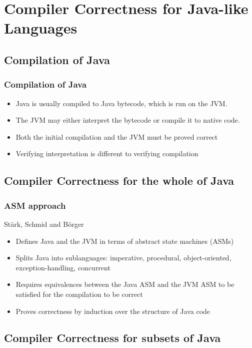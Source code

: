 \documentclass{beamer}
\newcommand{\footmake}[1]{
\ifthenelse{\equal{#1}{}}%
	{}%
	{\footnotetext{#1}}%
}
\newenvironment{slide}[2][fragile,environment=slide]
{\begin{frame}[#1]
	\frametitle{#2}\begin{refsegment}}
{\footmake{\printbibliography[segment=\therefsegment]}\end{refsegment}\end{frame}}
\begin{document}
\section{Compiler Correctness for Java-like Languages}

\frame{\sectionpage}

\subsection{Compilation of Java}

\begin{slide}{Compilation of Java}
\begin{itemize}
\item Java is usually compiled to Java bytecode, which is run on the JVM.
\item The JVM may either interpret the bytecode or compile it to native code.
\item Both the initial compilation and the JVM must be proved correct
\item Verifying interpretation is different to verifying compilation
\end{itemize}
\end{slide}

\subsection{Compiler Correctness for the whole of Java}

\begin{slide}{ASM approach}
St\"{a}rk, Schmid and B\"orger\cite{stark2001}
\begin{itemize}
\item Defines Java and the JVM in terms of abstract state machines (ASMs)
\item Splits Java into sublanguages: imperative, procedural, object-oriented, exception-handling, concurrent
\item Requires equivalences between the Java ASM and the JVM ASM to be satisfied for the compilation to be correct
\item Proves correctness by induction over the structure of Java code
\end{itemize}
\end{slide}

\subsection{Compiler Correctness for subsets of Java}
\end{document}
